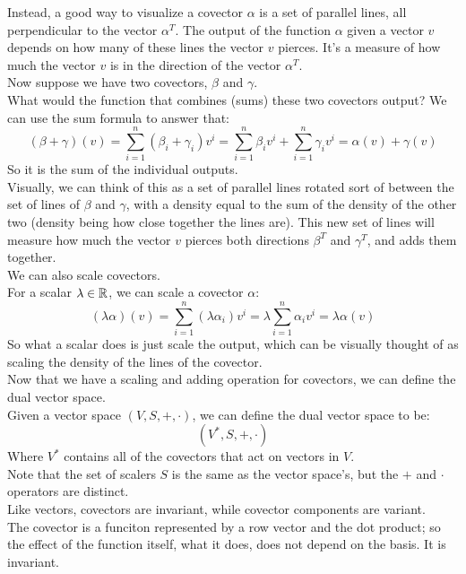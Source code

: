 \documentclass[12pt]{article}
\begin{document}
Instead, a good way to visualize
a covector $\alpha$ is a set of parallel lines,
all perpendicular to the vector $\alpha^T$.
The output of the function $\alpha$
given a vector $v$ depends on how many of
these lines the vector $v$ pierces.
It's a measure of how much the vector $v$ is in
the direction of the vector $\alpha^T$. \\

Now suppose we have two covectors,
$\beta$ and $\gamma$. \\
What would the function that combines (sums)
these two covectors output?
We can use the sum formula to answer that:
\[ (\beta + \gamma)(v)
= \sum_{i = 1}^{n} (\beta_i + \gamma_i)v^i
= \sum_{i = 1}^{n} \beta_iv^i
+ \sum_{i = 1}^{n} \gamma_iv^i
= \alpha(v) + \gamma(v) \]
So it is the sum of the individual outputs. \\
Visually, we can think of this
as a set of parallel lines rotated sort of
between the set of lines of $\beta$
and $\gamma$,
with a density equal to the sum of the
density of the other two (density being
how close together the lines are).
This new set of lines will measure
how much the vector $v$ pierces
both directions $\beta^T$ and $\gamma^T$,
and adds them together. \\

We can also scale covectors. \\
For a scalar $\lambda \in \mathbb{R}$,
we can scale a covector $\alpha$:
\[ (\lambda \alpha)(v)
= \sum_{i = 1}^{n} (\lambda \alpha_i)v^i
= \lambda \sum_{i = 1}^{n}\alpha_iv^i 
= \lambda \alpha(v)\]
So what a scalar does is just scale the output,
which can be visually thought of as scaling
the density of the lines of the covector. \\

Now that we have a scaling and adding operation
for covectors, we can define the dual vector
space. \\

Given a vector space $(V, S, +, \cdot)$,
we can define the dual vector space to be:
\[ (V^*, S, +, \cdot) \]
Where $V^*$ contains all of the covectors that
act on vectors in $V$. \\
Note that the set of scalers $S$
is the same as the vector space's,
but the $+$ and $\cdot$ operators
are distinct. \\

Like vectors, covectors are invariant,
while covector components are variant. \\

The covector is a funciton represented by 
a row vector and the dot product;
so the effect of the function itself,
what it does, does not depend on the basis.
It is invariant. \\
\end{document}
